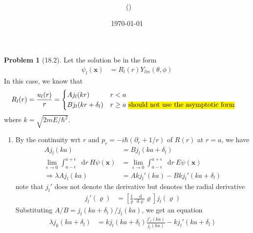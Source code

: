 \documentclass[twoside,11pt]{article}
\title{{\lms \Code \ \Ass}}
\author{\lms \name \ (\href{mailto:\mail}{\mail})}
\date{\sffamily \today}
\makeatletter
\renewcommand*\d{\mathop{}\!\mathrm{d}}
\theoremstyle{definition}
\newtheorem{problem}{Problem}
\theoremstyle{remark}
\newtheorem*{remark}{Remark}
\renewcommand{\maketitle}{\bgroup\setlength{\parindent}{0pt}
\begin{flushleft}
  \textbf{\Large\@title}

  \@author
\end{flushleft}\egroup
}
\makeatother
\begin{document}
\maketitle
\thispagestyle{title}



\begin{problem}[18.2]
Let the solution be in the form
\begin{align*}
    \psi_l(\mathbf{x}) &= R_l(r)Y_{lm}(\theta, \phi)
\end{align*}
In this case, we know that 
\begin{align*}
    R_l(r) &= \frac{u_l(r)}{r} = \begin{cases}
        A j_l(kr) & r < a\\
        B j_l(kr+\delta_l) & r \geq a\text{ \hl{should not use the asymptotic form}}
    \end{cases}
\end{align*}
where $k=\sqrt{2mE/\hbar^2}$.
\begin{enumerate}[label=(\alph*)]
\item By the continuity wrt $r$ and $p_r=-i\hbar(\partial_r + 1/r)$ of $R(r)$
at $r=a$, we have
\begin{align*}
    Aj_l(ka) &= B j_l(ka+\delta_l)\\
    \lim_{\epsilon\rightarrow 0}
    \int_{a-\epsilon}^{a+\epsilon} \d r\ H\psi(\mathbf{x}) &= 
    \lim_{\epsilon\rightarrow 0}
    \int_{a-\epsilon}^{a+\epsilon} \d r\ E\psi(\mathbf{x})\\
    \Rightarrow
    \lambda Aj_l(ka) &= 
    Akj_l'(ka) - Bkj_l'(ka+\delta_l)
\end{align*}
note that $j_l'$ does not denote the derivative but denotes the radial derivative
\begin{align*}
    j_l'(\varrho) &= \left[\frac{1}{\varrho}\frac{\d}{\d\varrho}\varrho\right] j_l(\varrho)
\end{align*}
Substituting $A/B = j_l(ka+\delta_l)/j_l(ka)$, we get an equation
\begin{align*}
    \lambda j_k(ka+\delta_l) &= 
    kj_l(ka+\delta_l)\frac{j'_l(ka)}{j_l(ka)} - 
    kj_l'(ka+\delta_l)\\

\end{align*}
\end{enumerate}
\end{problem}
\end{document}
